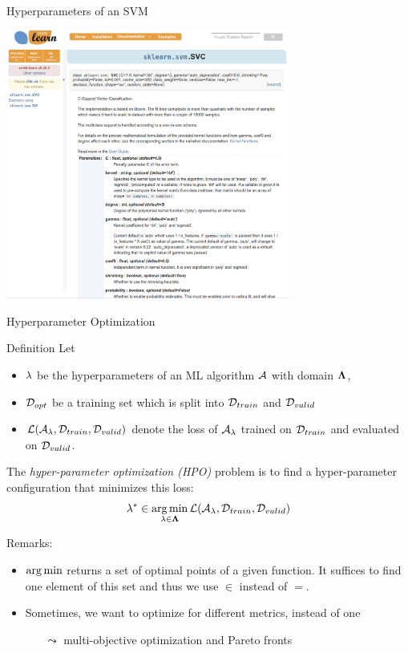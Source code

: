\begin{frame}[c]{Hyperparameters of an SVM}

\centering
\includegraphics[width=0.7\textwidth]{images/sklearn_svm_doc.png}

\end{frame}
\begin{frame}[c]{Hyperparameter Optimization}

\begin{block}{Definition}
	Let 
	\begin{itemize}
		\item $\mathbf{\lambda}$ be the hyperparameters of an ML algorithm $\mathcal{A}$ with domain $\mathbf{\Lambda}$,
		\pause
		\item $\mathcal{D}_{opt}$ be a training set which is split into $\mathcal{D}_{train}$ and $\mathcal{D}_{valid}$ 
		\pause
		\item $\mathcal{L}(\mathcal{A}_{\mathbf{\lambda}}, \mathcal{D}_{train}, \mathcal{D}_{valid})$ denote the loss of $\mathcal{A}_{\mathbf{\lambda}}$ trained on $\mathcal{D}_{train}$ and evaluated on $\mathcal{D}_{valid}$.
	\end{itemize}
	\pause
	The \emph{hyper-parameter optimization (HPO)} problem is to find a hyper-parameter configuration that minimizes this loss:
	\begin{equation}
	\mathbf{\lambda}^* \in \operatorname*{arg\,min}_{\mathbf{\lambda} \in \mathbf{\Lambda}} \mathcal{L}(\mathcal{A}_{\mathbf{\lambda}}, \mathcal{D}_{train}, \mathcal{D}_{valid}) \nonumber  
	\end{equation}
\end{block}

\pause
Remarks: 

\begin{itemize}
	\item $\operatorname*{arg\,min}$ returns a set of optimal points of a given function. It suffices to find one element of this set and thus we use $\in$ instead of $=$.
	\pause
	\item Sometimes, we want to optimize for different metrics, instead of one
	\begin{itemize}
		\item[$\leadsto$] multi-objective optimization and Pareto fronts
	\end{itemize}
\end{itemize}

\end{frame}
